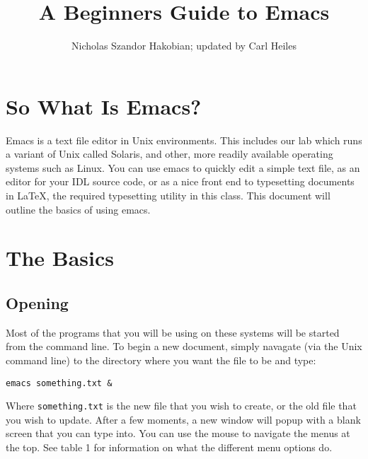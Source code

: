 \documentclass[preprint]{aastex}
\begin{document}
\setlength{\parskip}{0.02in}

\title{A Beginners Guide to Emacs}

\author{Nicholas Szandor Hakobian; updated by Carl Heiles}

\section{So What Is Emacs?}
Emacs is a text file editor in Unix environments. This includes our
lab which runs a variant of Unix called Solaris, and other, more
readily available operating systems such as Linux. You can use emacs
to quickly edit a simple text file, as an editor for your IDL source
code, or as a nice front end to typesetting documents in \LaTeX, the
required typesetting utility in this class. This document will outline
the basics of using emacs.

\section{The Basics}

\subsection{Opening}
Most of the programs that you will be using on these systems will be
started from the command line. To begin a new document, simply
navagate (via the Unix command line) to the directory where you want
the file to be and type: 
\begin{verbatim}
emacs something.txt &
\end{verbatim}
Where {\tt something.txt} is the new file that you wish to create, or
the old file that you wish to update. After a few moments, a new window
will popup with a blank screen that you can type into. You can use the
mouse to navigate the menus at the top. See table 1 for information on
what the different menu options do.
\end{document}
